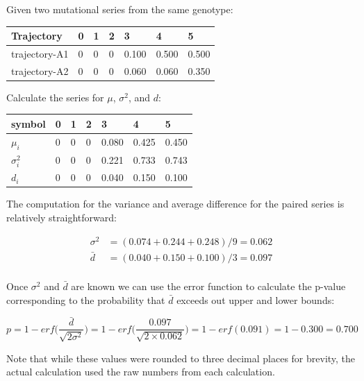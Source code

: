 \documentclass{report}
\begin{document}
Given two mutational series from the same genotype:

\begin{table}[H]
  \begin{center}
    \begin{tabular}{l|llllll}
    Trajectory & 0 & 1 & 2 & 3 & 4 & 5 \\
    \hline
    trajectory-A1 & 0 & 0 & 0 & 0.100 & 0.500 & 0.500 \\
    trajectory-A2 & 0 & 0 & 0 & 0.060 & 0.060 & 0.350 \\
    \end{tabular}
  \end{center}
\end{table}

Calculate the series for $\mu$, $\sigma^2$, and $d$:

\begin{table}[H]
  \begin{center}
    \begin{tabular}{l|llllll}
    symbol & 0 & 1 & 2 & 3 & 4 & 5 \\
    \hline
    $\mu_i$         & 0 & 0 & 0 & 0.080 & 0.425 & 0.450 \\
    $\sigma_i^2$    & 0 & 0 & 0 & 0.221 & 0.733 & 0.743 \\
    $d_i$           & 0 & 0 & 0 & 0.040 & 0.150 & 0.100 \\
    \end{tabular}
  \end{center}
\end{table}

The computation for the variance and average difference for the paired series is relatively straightforward:

\begin{align*}
  \sigma^2 &= (0.074+0.244+0.248)/9=0.062 \\
  \bar{d}  &= (0.040+0.150+0.100)/3=0.097 \\
\end{align*}

Once $\sigma^2$ and $\bar{d}$ are known we can use the error function to calculate the p-value corresponding to the probability that $\bar{d}$ exceeds out upper and lower bounds:

\[
p = 1 - erf \bigg(\frac{\bar{d}}{\sqrt{2\sigma^2}}\bigg)=
1-erf \bigg(\frac{0.097}{\sqrt{2 \times 0.062}}\bigg)=
1-erf(0.091)=1-0.300=0.700
\]

Note that while these values were rounded to three decimal places for brevity, the actual calculation used the raw numbers from each calculation.
\end{document}
